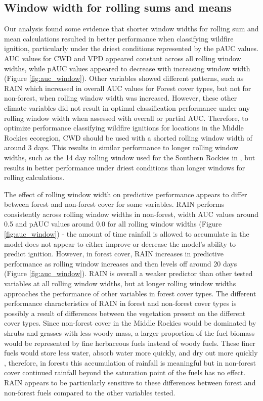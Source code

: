 \documentclass[11pt]{article}
\begin{document}
\subsection{Window width for rolling sums and means}

Our analysis found some evidence that shorter window widths for rolling sum and mean calculations resulted in better performance when classifying wildfire ignition, particularly under the driest conditions represented by the pAUC values. AUC values for CWD and VPD appeared constant across all rolling window widths, while pAUC values appeared to decrease with increasing window width (Figure \ref{fig:auc_window}). Other variables showed different patterns, such as RAIN which increased in overall AUC values for Forest cover types, but not for non-forest, when rolling window width was increased. However, these other climate variables did not result in optimal classification performance under any rolling window width when assessed with overall or partial AUC.  Therefore, to optimize performance classifying wildfire ignitions for locations in the Middle Rockies ecoregion, CWD should be used with a shorted rolling window width of around 3 days.  This results in similar performance to longer rolling window widths, such as the 14 day rolling window used for the Southern Rockies in  \citet{thomaWaterBalanceIndicator2020}, but results in better performance under driest conditions than longer windows for rolling calculations.

The effect of rolling window width on predictive performance appears to differ between forest and non-forest cover for some variables.  RAIN performs consistently across rolling window widths in non-forest, width AUC values around 0.5 and pAUC values around 0.0 for all rolling window widths (Figure \ref{fig:auc_window}) - the amount of time rainfall is allowed to accumulate in the model does not appear to either improve or decrease the model's ability to predict ignition. However, in forest cover, RAIN increases in predictive performance as rolling window increases and then levels off around 20 days (Figure \ref{fig:auc_window}). RAIN is overall a weaker predictor than other tested variables at all rolling window widths, but at longer rolling window widths approaches the performance of other variables in forest cover types. The different performance characteristics of RAIN in forest and non-forest cover types is possibly a result of differences between the vegetation present on the different cover types.  Since non-forest cover in the Middle Rockies would be dominated by shrubs and grasses with less woody mass, a larger proportion of the fuel biomass would be represented by fine herbaceous fuels instead of woody fuels. These finer fuels would store less water, absorb water more quickly, and dry out more quickly \citep{vineyReviewFineFuel1991}, therefore, in forests this accumulation of rainfall is meaningful but in non-forest cover continued rainfall beyond the saturation point of the fuels has no effect.  RAIN appears to be particularly sensitive to these differences between forest and non-forest fuels compared to the other variables tested.
\end{document}
